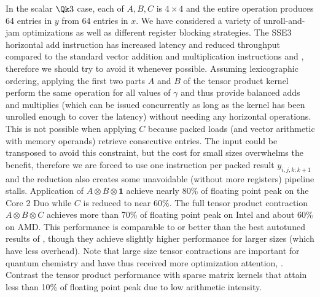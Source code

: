 In the scalar $\Qk 3$ case, each of $A,B,C$ is $4\times 4$ and the entire operation produces 64 entries in $y$ from 64 entries in $x$.
We have considered a variety of unroll-and-jam optimizations as well as different register blocking strategies.
The SSE3 horizontal add instruction  has increased latency and reduced throughput compared to the standard vector addition and multiplication instructions  and , therefore we should try to avoid it whenever possible.
Assuming lexicographic ordering, applying the first two parts $A$ and $B$ of the tensor product kernel perform the same operation for all values of $\gamma$ and thus provide balanced adds and multiplies (which can be issued concurrently as long as the kernel has been unrolled enough to cover the latency) without needing any horizontal operations.
This is not possible when applying $C$ because packed loads (and vector arithmetic with memory operands) retrieve consecutive entries.
The input could be transposed to avoid this constraint, but the cost for small sizes overwhelms the benefit, therefore we are forced to use one  instruction per packed result $y_{i,j,k:k+1}$ and the reduction also creates some unavoidable (without more registers) pipeline stalls.
Application of $A\otimes B\otimes \bm 1$ achieve nearly 80\% of floating point peak on the Core 2 Duo while $C$ is reduced to near 60\%.
The full tensor product contraction $A\otimes B\otimes C$ achieves more than 70\% of floating point peak on Intel and about 60\% on AMD.
This performance is comparable to or better than the best autotuned results of \cite{shin2010speeding}, though they achieve slightly higher performance for larger sizes (which have less overhead).
Note that large size tensor contractions are important for quantum chemistry and have thus received more optimization attention, \eg \cite{kaushik2008improving,hirata2003tensor}.
Contrast the tensor product performance with sparse matrix kernels that attain less than 10\% of floating point peak due to low arithmetic intensity.

